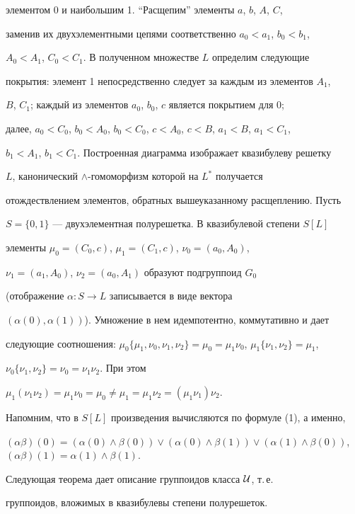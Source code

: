 элементом 0 и наибольшим 1. ``Расщепим'' элементы $a$, $b$, $A$, $C$,


заменив их двухэлементными цепями соответственно $a_0<a_1$, $b_0<b_1$,


$A_0<A_1$, $C_0<C_1$. В полученном множестве $L$ определим следующие


покрытия: элемент 1 непосредственно следует за каждым из элементов $A_1$,


$B$, $C_1$; каждый из элементов $a_0$, $b_0$, $c$ является покрытием для 0;


далее, $a_0<C_0$, $b_0<A_0$, $b_0<C_0$, $c<A_0$, $c<B$, $a_1<B$, $a_1<C_1$,


$b_1<A_1$, $b_1<C_1$. Построенная диаграмма изображает квазибулеву решетку


$L$, канонический $\wedge$-гомоморфизм которой на $L^*$ получается


отождествлением элементов, обратных вышеуказанному расщеплению. Пусть


$S=\{0,1\}$ --- двухэлементная полурешетка. В квазибулевой степени $S[L]$


элементы $\mu_0=(C_0,c)$, $\mu_1=(C_1,c)$, $\nu_0=(a_0,A_0)$,


$\nu_1=(a_1,A_0)$, $\nu_2=(a_0,A_1)$ образуют подгруппоид $G_0$


(отображение $\alpha: S\to L$ записывается в виде вектора


$(\alpha(0),\alpha(1))$). Умножение в нем идемпотентно, коммутативно и дает


следующие соотношения: $\mu_0\{\mu_1,\nu_0,


\nu_1,\nu_2\}=\mu_0=\mu_1\nu_0$, $\mu_1\{\nu_1,\nu_2\}=\mu_1$,


$\nu_0\{\nu_1,\nu_2\}=\nu_0=\nu_1\nu_2$. При этом


$\mu_1(\nu_1\nu_2)=\mu_1\nu_0=\mu_0\ne\mu_1=\mu_1\nu_2=(\mu_1\nu_1)\nu_2$.


Напомним, что в $S[L]$ произведения вычисляются по формуле (1), а именно,


$(\alpha\beta)(0)=(\alpha(0)\wedge\beta(0))\vee(\alpha(0)\wedge\beta(1))


\vee(\alpha(1)\wedge\beta(0))$, $(\alpha\beta)(1)=\alpha(1)\wedge\beta(1)$.





Следующая теорема дает описание группоидов класса $\cal U$, т.\,е.


группоидов, вложимых в квазибулевы степени полурешеток.





